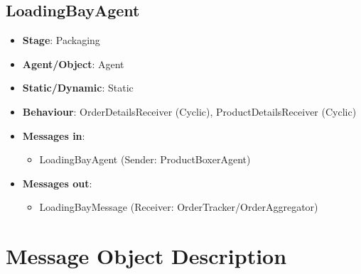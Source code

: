 \documentclass[12pt]{article}
\begin{document}
\newpage{}

\subsection{LoadingBayAgent}
\begin{itemize}
    \item \textbf{Stage}: Packaging
    \item \textbf{Agent/Object}: Agent
    \item \textbf{Static/Dynamic}: Static
    \item \textbf{Behaviour}: OrderDetailsReceiver (Cyclic), ProductDetailsReceiver (Cyclic)
    \item \textbf{Messages in}:
        \begin{itemize}
            \item LoadingBayAgent (Sender: ProductBoxerAgent)
        \end{itemize}
    \item \textbf{Messages out}:
        \begin{itemize}
            \item LoadingBayMessage (Receiver: OrderTracker/OrderAggregator)
        \end{itemize}
\end{itemize}

\section{Message Object Description}
\end{document}
